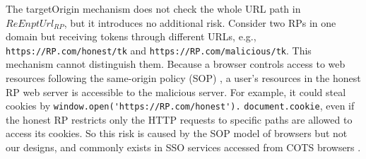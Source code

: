 The targetOrigin mechanism does not check the whole URL path in $ReEnptUrl_{RP}$, but it introduces no additional risk.
Consider two RPs in one domain but receiving tokens through different URLs,
 e.g., \verb+https://RP.com/honest/tk+ and \verb+https://RP.com/malicious/tk+.
This mechanism cannot distinguish them.
%
%
Because a browser controls access to web resources following the same-origin policy (SOP) \cite{sop},
    a user's resources in the honest RP web server is accessible to  the malicious server.
 For example, it could steal cookies by \verb+window.open('https://RP.com/honest').+ \verb+document.cookie+,
 even if the honest RP restricts only the HTTP requests to specific paths are allowed to access its cookies.
So this risk is caused by the SOP model of browsers but not our designs,
    and commonly exists in SSO services accessed from COTS browsers \cite{rfc6749,SPRESSO,MITREid,GoogleIdIntegrate,uber}.
    
    
    



